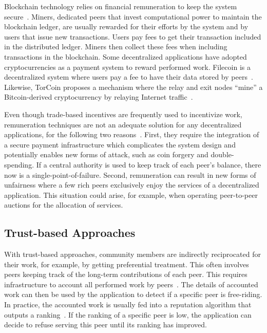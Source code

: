 Blockchain technology relies on financial remuneration to keep the system secure~\cite{easley2019mining}.
Miners, dedicated peers that invest computational power to maintain the blockchain ledger, are usually rewarded for their efforts by the system and by users that issue new transactions.
Users pay fees to get their transaction included in the distributed ledger.
Miners then collect these fees when including transactions in the blockchain.
Some decentralized applications have adopted cryptocurrencies as a payment system to reward performed work.
Filecoin is a decentralized system where users pay a fee to have their data stored by peers~\cite{benet2018filecoin}.
Likewise, TorCoin proposes a mechanism where the relay and exit nodes \enquote{mine} a Bitcoin-derived cryptocurrency by relaying Internet traffic~\cite{ghosh2014torpath}.

Even though trade-based incentives are frequently used to incentivize work, remuneration techniques are not an adequate solution for any decentralized applications, for the following two reasons~\cite{hummel2003earning}.
First, they require the integration of a secure payment infrastructure which complicates the system design and potentially enables new forms of attack, such as coin forgery and double-spending.
If a central authority is used to keep track of each peer's balance, there now is a single-point-of-failure.
Second, remuneration can result in new forms of unfairness where a few rich peers exclusively enjoy the services of a decentralized application.
This situation could arise, for example, when operating peer-to-peer auctions for the allocation of services.

\subsection{Trust-based Approaches}
With trust-based approaches, community members are indirectly reciprocated for their work, for example, by getting preferential treatment.
This often involves peers keeping track of the long-term contributions of each peer.
This requires infrastructure to account all performed work by peers~\cite{meulpolder2009bartercast}.
The details of accounted work can then be used by the application to detect if a specific peer is free-riding.
In practice, the accounted work is usually fed into a reputation algorithm that outputs a ranking~\cite{karakaya2009free}.
If the ranking of a specific peer is low, the application can decide to refuse serving this peer until its ranking has improved.

